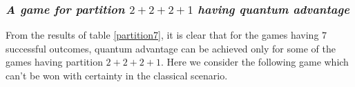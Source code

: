\documentclass[]{svjour3}
\begin{document}





\subsubsection{\it A game for partition $2+2+2+1$ having quantum advantage}



From the results of table \ref{partition7}, it is clear that for the games having $7$ successful outcomes, quantum advantage can be achieved only for some of the games having partition $2+2+2+1$.
Here we consider the following game which can't be won with certainty in the classical scenario.


\end{document}
